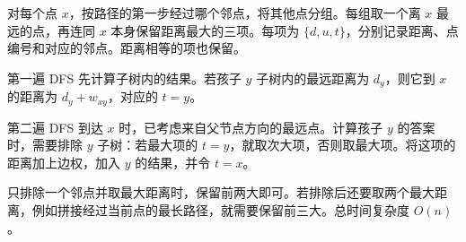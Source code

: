 对每个点 $x$，按路径的第一步经过哪个邻点，将其他点分组。每组取一个离 $x$ 最远的点，再连同 $x$ 本身保留距离最大的三项。每项为 $\{d,u,t\}$，分别记录距离、点编号和对应的邻点。距离相等的项也保留。

第一遍 DFS 先计算子树内的结果。若孩子 $y$ 子树内的最远距离为 $d_y$，则它到 $x$ 的距离为 $d_y+w_{xy}$，对应的 $t=y$。

第二遍 DFS 到达 $x$ 时，已考虑来自父节点方向的最远点。计算孩子 $y$ 的答案时，需要排除 $y$ 子树：若最大项的 $t=y$，就取次大项，否则取最大项。将这项的距离加上边权，加入 $y$ 的结果，并令 $t=x$。

只排除一个邻点并取最大距离时，保留前两大即可。若排除后还要取两个最大距离，例如拼接经过当前点的最长路径，就需要保留前三大。总时间复杂度 $O(n)$。
